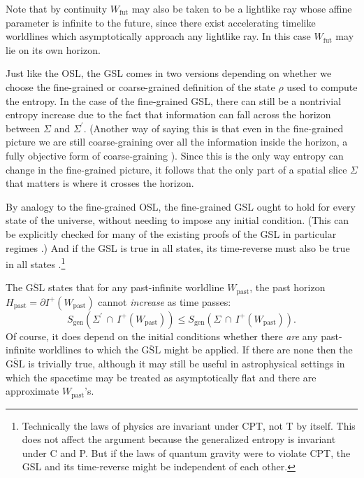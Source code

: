 \documentclass{article}
\begin{document}
Note that by continuity $W_\mathrm{fut}$ may also be taken to be a lightlike ray whose affine parameter is infinite to the future, since there exist accelerating timelike worldlines which asymptotically approach any lightlike ray.  In this case $W_\mathrm{fut}$ may lie on its own horizon.

Just like the OSL, the GSL comes in two versions depending on whether we choose the fine-grained or coarse-grained definition of the state $\rho$ used to compute the entropy.  In the case of the fine-grained GSL, there can still be a nontrivial entropy increase due to the fact that information can fall across the horizon between $\Sigma$ and $\Sigma^\prime$.  (Another way of saying this is that even in the fine-grained picture we are still coarse-graining over all the information inside the horizon, a fully objective form of coarse-graining \cite{sorkin10theses}).  Since this is the only way entropy can change in the fine-grained picture, it follows that the only part of a spatial slice $\Sigma$ that matters is where it crosses the horizon.

By analogy to the fine-grained OSL, the fine-grained GSL ought to hold for every state of the universe, without needing to impose any initial condition.  (This can be explicitly checked for many of the existing proofs of the GSL in particular regimes \cite{10proofs, myproofs}.)  And if the GSL is true in all states, its time-reverse must also be true in all states \cite{anec}.\footnote{Technically the laws of physics are invariant under CPT, not T by itself.  This does not affect the argument because the generalized entropy is invariant under C and P.  But if the laws of quantum gravity were to violate CPT, the GSL and its time-reverse might be independent of each other.}
  
The $\overline{\mathrm{GSL}}$ states that for any past-infinite worldline $W_\mathrm{past}$, the past horizon $H_\mathrm{past} = \partial I^+(W_\mathrm{past})$ cannot \emph{increase} as time passes:
\begin{equation}
S_{\mathrm{gen}}(\Sigma^\prime\,\cap\,I^+(W_\mathrm{past})) 
\le S_{\mathrm{gen}}(\Sigma\,\cap\,I^+(W_\mathrm{past})).
\end{equation}
Of course, it does depend on the initial conditions whether there \emph{are} any past-infinite worldlines to which the $\overline{\mathrm{GSL}}$ might be applied.  If there are none then the $\overline{\mathrm{GSL}}$ is trivially true, although it may still be useful in astrophysical settings in which the spacetime may be treated as asymptotically flat and there are approximate $W_\mathrm{past}$'s.
\end{document}
